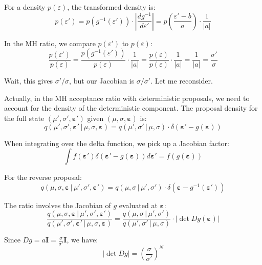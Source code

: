 \documentclass[11pt,a4paper]{article}
\theoremstyle{definition}
\newcommand{\eps}{\varepsilon}
\newcommand{\given}{\,|\,}
\begin{document}
For a density $p(\eps)$, the transformed density is:
\begin{equation}
    p(\eps') = p(g^{-1}(\eps')) \cdot \left|\frac{d g^{-1}}{d\eps'}\right| = p\left(\frac{\eps' - b}{a}\right) \cdot \frac{1}{|a|}
\end{equation}

In the MH ratio, we compare $p(\eps')$ to $p(\eps)$:
\begin{equation}
    \frac{p(\eps')}{p(\eps)} = \frac{p(g^{-1}(\eps'))}{p(\eps)} \cdot \frac{1}{|a|}
    = \frac{p(\eps)}{p(\eps)} \cdot \frac{1}{|a|} = \frac{1}{|a|} = \frac{\sigma'}{\sigma}
\end{equation}

Wait, this gives $\sigma'/\sigma$, but our Jacobian is $\sigma/\sigma'$. Let me reconsider.

Actually, in the MH acceptance ratio with deterministic proposals, we need to account
for the density of the deterministic component. The proposal density for the full
state $(\mu', \sigma', \bm{\eps}')$ given $(\mu, \sigma, \bm{\eps})$ is:
\begin{equation}
    q(\mu', \sigma', \bm{\eps}' \given \mu, \sigma, \bm{\eps}) = q(\mu', \sigma' \given \mu, \sigma) \cdot \delta(\bm{\eps}' - g(\bm{\eps}))
\end{equation}

When integrating over the delta function, we pick up a Jacobian factor:
\begin{equation}
    \int f(\bm{\eps}') \delta(\bm{\eps}' - g(\bm{\eps})) d\bm{\eps}' = f(g(\bm{\eps}))
\end{equation}

For the reverse proposal:
\begin{equation}
    q(\mu, \sigma, \bm{\eps} \given \mu', \sigma', \bm{\eps}') = q(\mu, \sigma \given \mu', \sigma') \cdot \delta(\bm{\eps} - g^{-1}(\bm{\eps}'))
\end{equation}

The ratio involves the Jacobian of $g$ evaluated at $\bm{\eps}$:
\begin{equation}
    \frac{q(\mu, \sigma, \bm{\eps} \given \mu', \sigma', \bm{\eps}')}{q(\mu', \sigma', \bm{\eps}' \given \mu, \sigma, \bm{\eps})}
    = \frac{q(\mu, \sigma \given \mu', \sigma')}{q(\mu', \sigma' \given \mu, \sigma)} \cdot |\det Dg(\bm{\eps})|
\end{equation}

Since $Dg = a \bm{I} = \frac{\sigma}{\sigma'} \bm{I}$, we have:
\begin{equation}
    |\det Dg| = \left(\frac{\sigma}{\sigma'}\right)^N
\end{equation}
\end{document}
